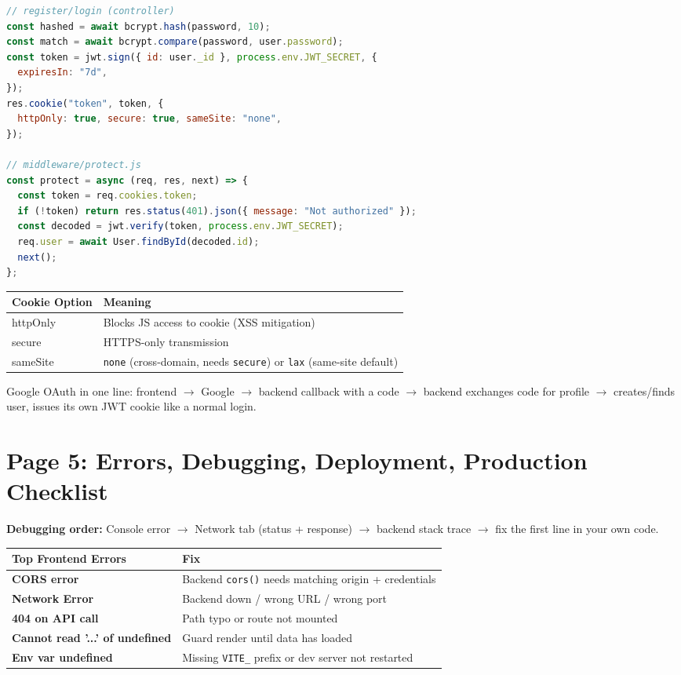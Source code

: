 \begin{lstlisting}[language=JavaScript]
// register/login (controller)
const hashed = await bcrypt.hash(password, 10);
const match = await bcrypt.compare(password, user.password);
const token = jwt.sign({ id: user._id }, process.env.JWT_SECRET, {
  expiresIn: "7d",
});
res.cookie("token", token, {
  httpOnly: true, secure: true, sameSite: "none",
});

// middleware/protect.js
const protect = async (req, res, next) => {
  const token = req.cookies.token;
  if (!token) return res.status(401).json({ message: "Not authorized" });
  const decoded = jwt.verify(token, process.env.JWT_SECRET);
  req.user = await User.findById(decoded.id);
  next();
};
\end{lstlisting}

\begin{tabularx}{\textwidth}{@{}>{\ttfamily}p{3cm}X@{}}
\toprule
Cookie Option & Meaning \\
\midrule
httpOnly & Blocks JS access to cookie (XSS mitigation) \\
secure & HTTPS-only transmission \\
sameSite & \texttt{none} (cross-domain, needs \texttt{secure}) or
\texttt{lax} (same-site default) \\
\bottomrule
\end{tabularx}

Google OAuth in one line: frontend $\to$ Google $\to$ backend callback with a code $\to$ backend exchanges code for profile $\to$ creates/finds user, issues its own JWT cookie like a normal login.

\newpage
\section*{Page 5: Errors, Debugging, Deployment, Production Checklist}

\textbf{Debugging order:} Console error $\to$ Network tab (status + response) $\to$ backend stack trace $\to$ fix the first line in your own code.

\begin{tabularx}{\textwidth}{@{}>{\bfseries}p{3cm}X@{}}
\toprule
Top Frontend Errors & Fix \\
\midrule
CORS error & Backend \texttt{cors()} needs matching origin + credentials \\
Network Error & Backend down / wrong URL / wrong port \\
404 on API call & Path typo or route not mounted \\
Cannot read '...' of undefined & Guard render until data has loaded \\
Env var undefined & Missing \texttt{VITE\_} prefix or dev server not
restarted \\
\bottomrule
\end{tabularx}

